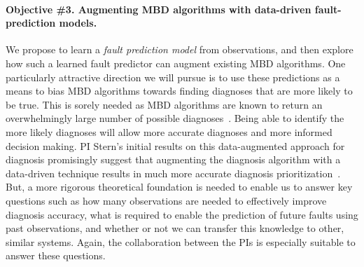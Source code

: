 \documentclass[12pt]{article}
\newcommand{\note}[1]{\textbf{\textit{#1}}}
\begin{document}
\vspace{-0.35cm}
\paragraph{Objective \#3. Augmenting MBD algorithms with data-driven fault-prediction models.} 
We propose to learn a {\em fault prediction model} from observations, and then explore how such a learned fault predictor can augment existing MBD algorithms. 
One particularly attractive direction we will pursue is to use these predictions as a means to bias MBD algorithms towards finding diagnoses that are more likely to be true. This is sorely needed as MBD algorithms are known to return an overwhelmingly large number of possible diagnoses~\cite{stern2015many}. Being able to identify the more likely diagnoses will allow more accurate diagnoses and more informed decision making. PI Stern's initial results on this data-augmented approach for diagnosis promisingly suggest that augmenting the diagnosis algorithm with a data-driven technique results in much more accurate diagnosis prioritization~\cite{elmishali2016dataAugmented}. But, a more rigorous theoretical foundation is needed to enable us to answer key questions such as how many observations are needed to effectively improve diagnosis accuracy, what is required to enable the prediction of future faults using past observations, and whether or not we can transfer this knowledge to other, similar systems. Again, the collaboration between the PIs is especially suitable to answer these questions. 




\end{document}
